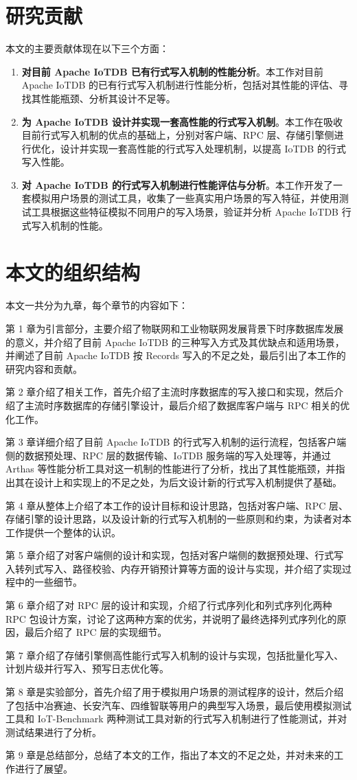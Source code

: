 \section{研究贡献}
本文的主要贡献体现在以下三个方面：
\begin{enumerate}
  \item \textbf{对目前 Apache IoTDB 已有行式写入机制的性能分析}。本工作对目前 Apache IoTDB 的已有行式写入机制进行性能分析，包括对其性能的评估、寻找其性能瓶颈、分析其设计不足等。
  \item \textbf{为 Apache IoTDB 设计并实现一套高性能的行式写入机制}。本工作在吸收目前行式写入机制的优点的基础上，分别对客户端、RPC 层、存储引擎侧进行优化，设计并实现一套高性能的行式写入处理机制，以提高 IoTDB 的行式写入性能。
  \item \textbf{对 Apache IoTDB 的行式写入机制进行性能评估与分析}。本工作开发了一套模拟用户场景的测试工具，收集了一些真实用户场景的写入特征，并使用测试工具根据这些特征模拟不同用户的写入场景，验证并分析 Apache IoTDB 行式写入机制的性能。
\end{enumerate}

\section{本文的组织结构}

本文一共分为九章，每个章节的内容如下：

第 1 章为引言部分，主要介绍了物联网和工业物联网发展背景下时序数据库发展的意义，并介绍了目前 Apache IoTDB 的三种写入方式及其优缺点和适用场景，并阐述了目前 Apache IoTDB 按 Records 写入的不足之处，最后引出了本工作的研究内容和贡献。

第 2 章介绍了相关工作，首先介绍了主流时序数据库的写入接口和实现，然后介绍了主流时序数据库的存储引擎设计，最后介绍了数据库客户端与 RPC 相关的优化工作。

第 3 章详细介绍了目前 Apache IoTDB 的行式写入机制的运行流程，包括客户端侧的数据预处理、RPC 层的数据传输、IoTDB 服务端的写入处理等，并通过 Arthas 等性能分析工具对这一机制的性能进行了分析，找出了其性能瓶颈，并指出其在设计上和实现上的不足之处，为后文设计新的行式写入机制提供了基础。

第 4 章从整体上介绍了本工作的设计目标和设计思路，包括对客户端、RPC 层、存储引擎的设计思路，以及设计新的行式写入机制的一些原则和约束，为读者对本工作提供一个整体的认识。

第 5 章介绍了对客户端侧的设计和实现，包括对客户端侧的数据预处理、行式写入转列式写入、路径校验、内存开销预计算等方面的设计与实现，并介绍了实现过程中的一些细节。

第 6 章介绍了对 RPC 层的设计和实现，介绍了行式序列化和列式序列化两种 RPC 包设计方案，讨论了这两种方案的优劣，并说明了最终选择列式序列化的原因，最后介绍了 RPC 层的实现细节。

第 7 章介绍了存储引擎侧高性能行式写入机制的设计与实现，包括批量化写入、计划片级并行写入、预写日志优化等。

第 8 章是实验部分，首先介绍了用于模拟用户场景的测试程序的设计，然后介绍了包括中冶赛迪、长安汽车、四维智联等用户的典型写入场景，最后使用模拟测试工具和 IoT-Benchmark\cite{liu2019benchmarking} 两种测试工具对新的行式写入机制进行了性能测试，并对测试结果进行了分析。

第 9 章是总结部分，总结了本文的工作，指出了本文的不足之处，并对未来的工作进行了展望。